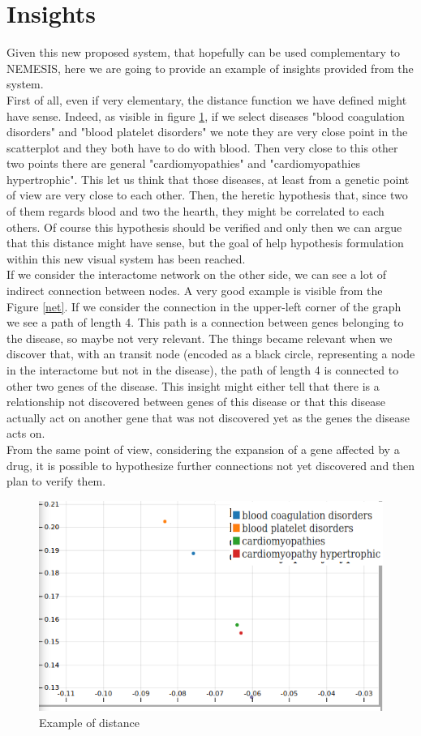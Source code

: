 \documentclass[12pt,twocolumn,twoside]{article}
\begin{document}
	\section*{Insights}
	Given this new proposed system, that hopefully can be used complementary to NEMESIS,  here we are going to provide an example of insights provided from the system.\\ First of all, even if very elementary, the distance function we have defined might have sense. Indeed, as visible in figure \ref{dist}, if we select diseases "blood coagulation disorders" and "blood platelet disorders" we note they are very close point in the scatterplot and they both have to do with blood. Then very close to this other two points there are general "cardiomyopathies" and "cardiomyopathies hypertrophic". This let us think that those diseases, at least from a genetic point of view are very close to each other. Then, the heretic hypothesis that, since two of them regards blood and two the hearth, they might be correlated to each others. Of course this hypothesis should be verified and only then we can argue that this distance might have sense, but the goal of help hypothesis formulation within this new visual system has been reached.\\
	If we consider the interactome network on the other side, we can see a lot of indirect connection between nodes. A very good example is visible from the Figure \ref{net}. If we consider the connection in the upper-left corner of the graph we see a path of length 4. This path is a connection between genes belonging to the disease, so maybe not very relevant. The things became relevant when we discover that, with an transit node (encoded as a black circle, representing a node in the interactome but not in the disease), the path of length 4 is connected to other two genes of the disease. This insight might either tell that there is a relationship not discovered between genes of this disease or that this disease actually act on another gene that was not discovered yet as the genes the disease acts on.\\ From the same point of view, considering the expansion of a gene affected by a drug, it is possible to hypothesize further connections not yet discovered and then plan to verify them.
	
	\begin{figure}
		\includegraphics[width=.90\linewidth]{dist.png}
		\caption{Example of distance}
		\label{dist}
	\end{figure}
	
\end{document}
